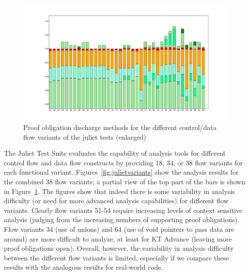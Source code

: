 \documentclass[11pt]{article}
\begin{document}
\begin{figure}[h]
\begin{center}
\includegraphics[width=\textwidth]{juliet_variants_fractions_zoom.png}
\end{center}
\caption{\label{fig:julietvariantszoom}Proof obligation discharge methods for the different
control/data flow variants  of the juliet tests (enlarged)}
\end{figure}


The Juliet Test Suite evaluates the capability of analysis tools for different control
flow and data flow constructs by providing 18, 34, or 38 flow variants for each 
functional variant.
Figures~\ref{fig:julietvariants} show the analysis results for the combined 38 flow variants;
a partial view of the top part of the bars is shown in Figure~\ref{fig:julietvariantszoom}.
The figures show that indeed there is some variability in analysis difficulty (or 
need for more advanced analysis capabilities) for different flow variants. Clearly
flow variants 51-54 require increasing levels of context sensitive analysis (judging
from the increasing numbers of supporting proof obligations). 
Flow variants 34 (use of unions) and 64 (use of void pointers to pass data are around)
are more difficult to analyze, at least for KT Advance (leaving more proof obligations
open). Overall, however, the variability in analysis difficulty between the different
flow variants is limited, especially if we compare these results with the analogous
results for real-world code.
\end{document}
